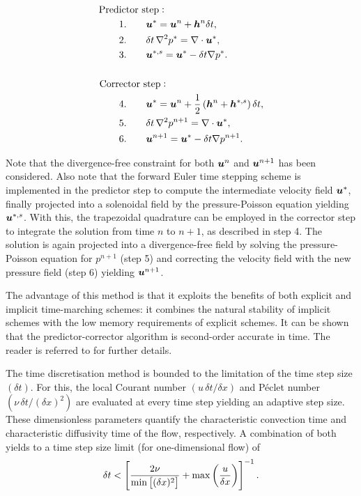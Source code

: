 \documentclass[../main.tex]{subfiles}
\begin{document}
\begin{align}
\mathrm{Pred}&\mathrm{ictor\,\,step:}\nonumber\\
&1.\qquad \boldsymbol{u}^* = \boldsymbol{u}^n+\boldsymbol{h}^n\delta t,\\
&2.\qquad {\delta t}\,\nabla^2p^*=\nabla\cdot\boldsymbol{u}^*,\label{eq:ppe1}\\
&3.\qquad \boldsymbol{u}^{*,s}=\boldsymbol{u}^*-\delta t\nabla p^*.
\nonumber\\
\nonumber\\
\mathrm{Corr}&\mathrm{ector\,\,step:}\nonumber\\
&4.\qquad \boldsymbol{u}^{*} = \boldsymbol{u}^n+\frac{1}{2}\left(\boldsymbol{h}^n+\boldsymbol{h}^{*,s} \right)\delta t,\\
&5.\qquad {\delta t}\,\nabla^2p^{n+1}=\nabla\cdot\boldsymbol{u}^{*},\label{eq:ppe2}\\
&6.\qquad \boldsymbol{u}^{n+1}=\boldsymbol{u}^{*}-\delta t\nabla p^{n+1}.
\end{align}

Note that the divergence-free constraint for both $\boldsymbol{u}^n$ and $\boldsymbol{u}^{n+1}$ has been considered.
Also note that the forward Euler time stepping scheme is implemented in the predictor step to compute the intermediate velocity field $\boldsymbol{u}^{*}$, finally projected into a solenoidal field by the pressure-Poisson equation yielding $\boldsymbol{u}^{*,s}$.
With this, the trapezoidal quadrature can be employed in the corrector step to integrate the solution from time $n$ to $n+1$, as described in step 4.
The solution is again projected into a divergence-free field by solving the pressure-Poisson equation for $p^{n+1}$ (step 5) and correcting the velocity field with the new pressure field (step 6) yielding $\boldsymbol{u}^{n+1}$.

The advantage of this method is that it exploits the benefits of both explicit and implicit time-marching schemes: it combines the natural stability of implicit schemes with the low memory requirements of explicit schemes.
It can be shown that the predictor-corrector algorithm is second-order accurate in time.
The reader is referred to \cite{Ferziger2002} for further details.

The time discretisation method is bounded to the limitation of the time step size $(\delta t)$.
For this, the local Courant number $(u\,\delta t/\delta x)$ and Péclet number $(\nu\,\delta t/(\delta x)^2)$ are evaluated at every time step yielding an adaptive step size.
These dimensionless parameters quantify the characteristic convection time and characteristic diffusivity time of the flow, respectively.
A combination of both yields to a time step size limit (for  one-dimensional flow) of
\begin{equation}
\delta t<\left[\frac{2\nu}{\min\left[(\delta x)^2\right]}+\max\left(\frac{u}{\delta x} \right)\right]^{-1}.
\end{equation}
\end{document}
